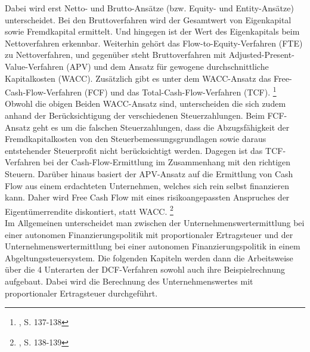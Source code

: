 \documentclass[12pt,a4paper,bibliography=totocnumbered,listof=totocnumbered]{article}
\begin{document}
Dabei wird erst Netto- und Brutto-Ansätze (bzw. Equity- und Entity-Ansätze) unterscheidet. 
Bei den Bruttoverfahren wird der Gesamtwert von Eigenkapital sowie Fremdkapital ermittelt. Und hingegen ist der Wert des Eigenkapitals beim Nettoverfahren erkennbar.
Weiterhin gehört das Flow-to-Equity-Verfahren (FTE) zu Nettoverfahren, und gegenüber steht Bruttoverfahren mit Adjusted-Present-Value-Verfahren (APV) und dem Ansatz für gewogene durchschnittliche Kapitalkosten (WACC).
Zusätzlich gibt es unter dem WACC-Ansatz das Free-Cash-Flow-Verfahren (FCF) und das Total-Cash-Flow-Verfahren (TCF).
\footnote[3]{\cite{Ballwieser2016}, S. 137-138}	\\
Obwohl die obigen Beiden WACC-Ansatz sind, unterscheiden die sich zudem anhand der Berücksichtigung der verschiedenen Steuerzahlungen. Beim FCF-Ansatz geht es um die falschen Steuerzahlungen, dass die Abzugsfähigkeit der Fremdkapitalkosten von den Steuerbemessungsgrundlagen sowie daraus entstehender Steuerprofit nicht berücksichtigt werden. 
Dagegen ist das TCF-Verfahren bei der Cash-Flow-Ermittlung im Zusammenhang mit den richtigen Steuern.
Darüber hinaus basiert der APV-Ansatz auf die Ermittlung von Cash Flow aus einem erdachteten Unternehmen, welches sich rein selbst finanzieren kann. 
Daher wird Free Cash Flow mit eines risikoangepassten Anspruches der Eigentümerrendite diskontiert, statt WACC.
\footnote[4]{\cite{Ballwieser2016}, S. 138-139}	\\
Im Allgemeinen unterscheidet man zwischen der Unternehmenswertermittlung bei einer autonomen Finanzierungspolitik mit proportionaler Ertragsteuer und der Unternehmenswertermittlung bei einer autonomen Finanzierungspolitik in einem Abgeltungssteuersystem. 
Die folgenden Kapiteln werden dann die Arbeitsweise über die 4 Unterarten der DCF-Verfahren sowohl auch ihre Beispielrechnung aufgebaut. 
Dabei wird die Berechnung des Unternehmenswertes mit proportionaler Ertragsteuer durchgeführt.
\pagebreak 


  
\end{document}
